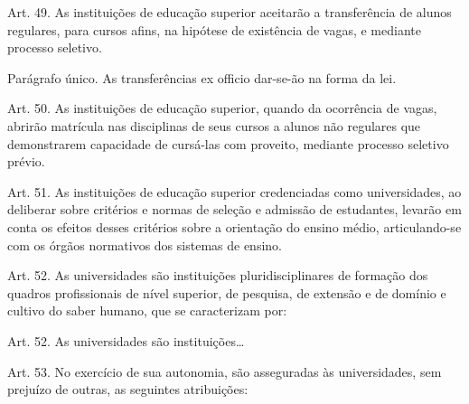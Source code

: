 \documentclass[]{beamer}
\begin{document}
\begin{frame}
  \huge Art. 49. As instituições de educação superior aceitarão a transferência de
  alunos regulares, para cursos afins, na hipótese de existência de vagas, e
  mediante processo seletivo.

  Parágrafo único. As transferências ex officio dar-se-ão na forma da lei.
\end{frame}

\begin{frame}
  \huge Art. 50. As instituições de educação superior, quando da ocorrência de vagas,
  abrirão matrícula nas disciplinas de seus cursos a alunos não regulares que
  demonstrarem capacidade de cursá-las com proveito, mediante processo seletivo
  prévio.
\end{frame}

\begin{frame}
  \huge Art. 51. As instituições de educação superior credenciadas como universidades,
  ao deliberar sobre critérios e normas de seleção e admissão de estudantes,
  levarão em conta os efeitos desses critérios sobre a orientação do ensino
  médio, articulando-se com os órgãos normativos dos sistemas de ensino.
\end{frame}

\begin{frame}
  \huge Art. 52. As universidades são instituições pluridisciplinares de formação
  dos quadros profissionais de nível superior, de pesquisa, de extensão e de
  domínio e cultivo do saber humano, que se caracterizam por:
\end{frame}

\begin{frame}{Art. 52. As universidades são instituições…}



\end{frame}

\begin{frame}{}
  \huge Art. 53. No exercício de sua autonomia, são asseguradas às universidades, sem
  prejuízo de outras, as seguintes atribuições:
\end{frame}
\end{document}
